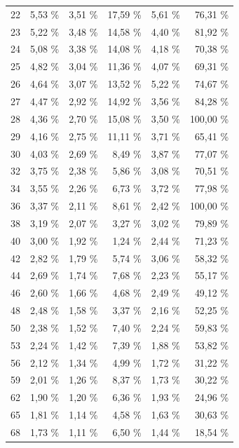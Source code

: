 \documentclass[11pt,twoside,a4paper]{report}
\begin{document}
{\begin{longtable}{rrrrrr}
    22    & 5,53 \% & 3,51 \% & 17,59 \% & 5,61 \% & 76,31 \% \\
    23    & 5,22 \% & 3,48 \% & 14,58 \% & 4,40 \% & 81,92 \% \\
    24    & 5,08 \% & 3,38 \% & 14,08 \% & 4,18 \% & 70,38 \% \\
    25    & 4,82 \% & 3,04 \% & 11,36 \% & 4,07 \% & 69,31 \% \\
    26    & 4,64 \% & 3,07 \% & 13,52 \% & 5,22 \% & 74,67 \% \\
    27    & 4,47 \% & 2,92 \% & 14,92 \% & 3,56 \% & 84,28 \% \\
    28    & 4,36 \% & 2,70 \% & 15,08 \% & 3,50 \% & 100,00 \% \\
    29    & 4,16 \% & 2,75 \% & 11,11 \% & 3,71 \% & 65,41 \% \\
    30    & 4,03 \% & 2,69 \% & 8,49 \% & 3,87 \% & 77,07 \% \\
    32    & 3,75 \% & 2,38 \% & 5,86 \% & 3,08 \% & 70,51 \% \\
    34    & 3,55 \% & 2,26 \% & 6,73 \% & 3,72 \% & 77,98 \% \\
    36    & 3,37 \% & 2,11 \% & 8,61 \% & 2,42 \% & 100,00 \% \\
    38    & 3,19 \% & 2,07 \% & 3,27 \% & 3,02 \% & 79,89 \% \\
    40    & 3,00 \% & 1,92 \% & 1,24 \% & 2,44 \% & 71,23 \% \\
    42    & 2,82 \% & 1,79 \% & 5,74 \% & 3,06 \% & 58,32 \% \\
    44    & 2,69 \% & 1,74 \% & 7,68 \% & 2,23 \% & 55,17 \% \\
    46    & 2,60 \% & 1,66 \% & 4,68 \% & 2,49 \% & 49,12 \% \\
    48    & 2,48 \% & 1,58 \% & 3,37 \% & 2,16 \% & 52,25 \% \\
    50    & 2,38 \% & 1,52 \% & 7,40 \% & 2,24 \% & 59,83 \% \\
    53    & 2,24 \% & 1,42 \% & 7,39 \% & 1,88 \% & 53,82 \% \\
    56    & 2,12 \% & 1,34 \% & 4,99 \% & 1,72 \% & 31,22 \% \\
    59    & 2,01 \% & 1,26 \% & 8,37 \% & 1,73 \% & 30,22 \% \\
    62    & 1,90 \% & 1,20 \% & 6,36 \% & 1,93 \% & 24,96 \% \\
    65    & 1,81 \% & 1,14 \% & 4,58 \% & 1,63 \% & 30,63 \% \\
    68    & 1,73 \% & 1,11 \% & 6,50 \% & 1,44 \% & 18,54 \% \\

\end{longtable}}
\end{document}
